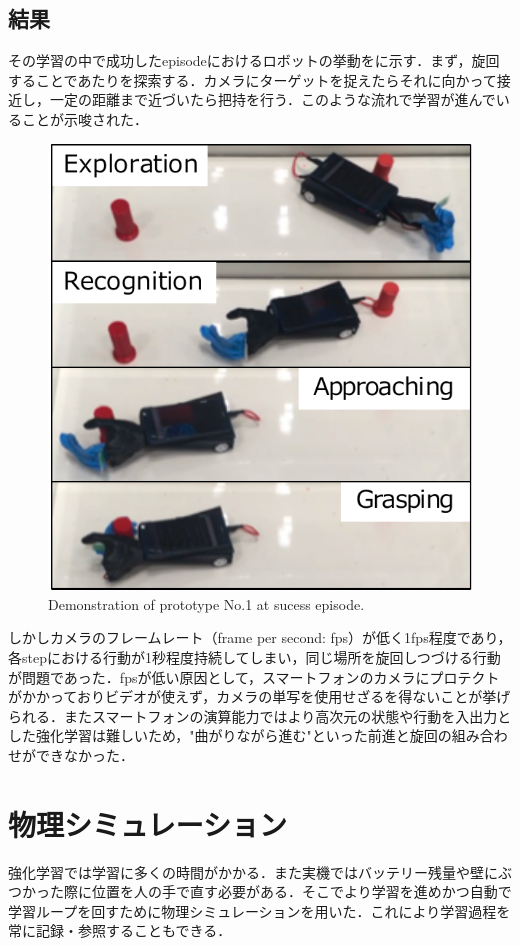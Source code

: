 \subsection{結果}
その学習の中で成功したepisodeにおけるロボットの挙動をに示す．まず，旋回することであたりを探索する．カメラにターゲットを捉えたらそれに向かって接近し，一定の距離まで近づいたら把持を行う．このような流れで学習が進んでいることが示唆された．

\begin{figure}[H]
    \centering
    \includegraphics[width=0.7\linewidth]{figure/chapter3/robothand-v1_demo}
    \caption{Demonstration of prototype No.1 at sucess episode.}
    \label{fig:1号機例}
\end{figure}

しかしカメラのフレームレート（frame per second: fps）が低く1fps程度であり，各stepにおける行動が1秒程度持続してしまい，同じ場所を旋回しつづける行動が問題であった．fpsが低い原因として，スマートフォンのカメラにプロテクトがかかっておりビデオが使えず，カメラの単写を使用せざるを得ないことが挙げられる．またスマートフォンの演算能力ではより高次元の状態や行動を入出力とした強化学習は難しいため，"曲がりながら進む"といった前進と旋回の組み合わせができなかった．


\section{物理シミュレーション}
強化学習では学習に多くの時間がかかる．また実機ではバッテリー残量や壁にぶつかった際に位置を人の手で直す必要がある．そこでより学習を進めかつ自動で学習ループを回すために物理シミュレーションを用いた．これにより学習過程を常に記録・参照することもできる．


